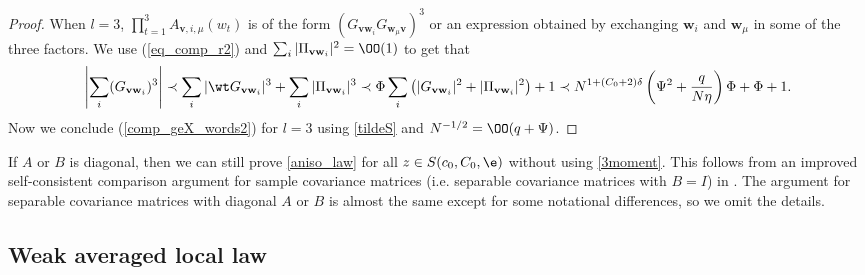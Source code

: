 \begin{proof}
When $l = 3$, $\prod_{t=1}^3 A_{\mathbf v, i, \mu}(w_t)$ is of the form 
$( G_{\mathbf v\mathbf w_i} G_{\mathbf w_\mu \mathbf v})^3$ or an expression obtained by exchanging $\mathbf w_i$ and $\mathbf w_\mu$ in some of the three factors. We use (\ref{eq_comp_r2}) and $\sum_i|\Pi_{\mathbf v\mathbf w_i}|^2 = \OO(1)$ to get that
\[\left|\sum_i( G_{\mathbf v\mathbf w_i})^3\right|\prec \sum_i|\wt G_{\mathbf v\mathbf w_i}|^3+\sum_i|\Pi_{\mathbf v\mathbf w_i}|^3\prec \Phi\sum_i \left(| G_{\mathbf v\mathbf w_i}|^2+|\Pi_{\mathbf v\mathbf w_i}|^2 \right)+1\prec N^{1+(C_0+2)\delta}\left(\Psi^2 +\frac{q}{N\eta}\right)\Phi+\Phi+1.\]
Now we conclude (\ref{comp_geX_words2}) for $l=3$ using \eqref{tildeS} and $N^{-1/2}=\OO( q+\Psi)$.
\end{proof}


If $A$ or $B$ is diagonal, then we can still prove \eqref{aniso_law} for all $z\in S(c_0,C_0,\e)$ without using \eqref{3moment}. This follows from an improved self-consistent comparison argument for sample covariance matrices (i.e. separable covariance matrices with $B=I$) in \cite[Section 8]{Anisotropic}. The argument for separable covariance matrices with diagonal $A$ or $B$ is almost the same except for some notational differences, so we omit the details. 



\subsection{Weak averaged local law}\label{section_averageTX}

%

